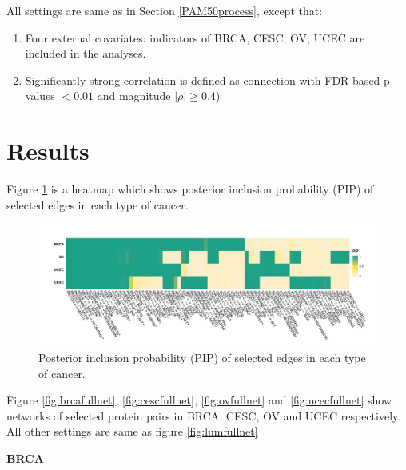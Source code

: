 \documentclass[
]{book}
\begin{document}
All settings are same as in Section \ref{PAM50process}, except that:

\begin{enumerate}
\def\labelenumi{(\Roman{enumi})}
\item
  Four external covariates: indicators of BRCA, CESC, OV, UCEC are included in the analyses.
\item
  Significantly strong correlation is defined as connection with FDR based p-values \(<0.01\) and magnitude \(\mid \rho \mid \geq 0.4\))
\end{enumerate}

\hypertarget{Gyneresult}{%
\section{Results}\label{Gyneresult}}

Figure \ref{fig:panpip} is a heatmap which shows posterior inclusion probability (PIP) of selected edges in each type of cancer.

\begin{figure}

{\centering \includegraphics[width=0.9\linewidth]{images/pan_pip} 

}

\caption{Posterior inclusion probability (PIP) of selected edges in each type of cancer.}\label{fig:panpip}
\end{figure}

Figure \ref{fig:brcafullnet}, \ref{fig:cescfullnet}, \ref{fig:ovfullnet} and \ref{fig:ucecfullnet} show networks of selected protein pairs in BRCA, CESC, OV and UCEC respectively. All other settings are same as figure \ref{fig:lumfullnet}

\textbf{BRCA}
\end{document}
